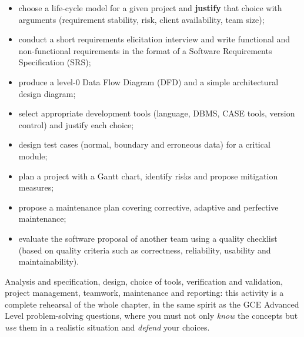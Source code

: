 \documentclass[11pt]{article}
\newcommand{\cle}[1]{{\popxbold\color{popdark}#1}}
\newcounter{popsec}
\newcounter{popsub}
\newcommand{\courssub}[1]{%
  \stepcounter{popsub}%
  \par\vspace{9pt}\noindent{\popxbold\fontsize{11.5}{13}\selectfont\color{popink}{\color{poporange}\thepopsec.\thepopsub}\hspace{6pt}#1}\par\nopagebreak\vspace{4pt}
}
\begin{document}
\begin{itemize}
\item choose a \cle{life-cycle model} for a given project and \textbf{justify} that choice with arguments (requirement stability, risk, client availability, team size);
\item conduct a short \cle{requirements elicitation} interview and write \cle{functional} and \cle{non-functional requirements} in the format of a \cle{Software Requirements Specification} (SRS);
\item produce a level-0 \cle{Data Flow Diagram} (DFD) and a simple \cle{architectural design} diagram;
\item select appropriate \cle{development tools} (language, DBMS, CASE tools, version control) and justify each choice;
\item design \cle{test cases} (normal, boundary and erroneous data) for a critical module;
\item plan a project with a \cle{Gantt chart}, identify \cle{risks} and propose mitigation measures;
\item propose a \cle{maintenance plan} covering corrective, adaptive and perfective maintenance;
\item evaluate the software proposal of another team using a \cle{quality checklist} (based on quality criteria such as correctness, reliability, usability and maintainability).
\end{itemize}

\begin{aretenir}
Analysis and specification, design, choice of tools, verification and validation, project management, teamwork, maintenance and reporting: this activity is a complete rehearsal of the whole chapter, in the same spirit as the GCE Advanced Level problem-solving questions, where you must not only \emph{know} the concepts but \emph{use} them in a realistic situation and \emph{defend} your choices.
\end{aretenir}

\courssub{Situation}
\end{document}
